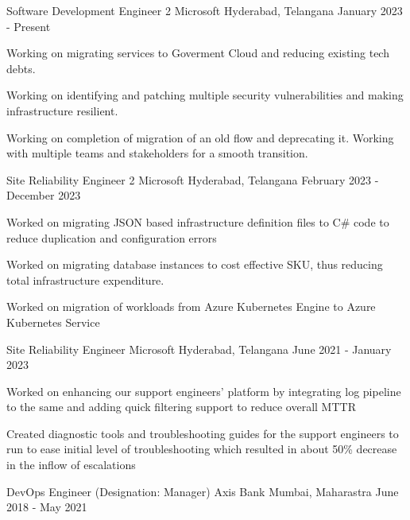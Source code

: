 
\begin{cventries}
  \cventry
  { Software Development Engineer 2}
  {Microsoft}
  {Hyderabad, Telangana}
  { January 2023 - Present}
  {
  \begin{cvitems}
      \item {Working on migrating services to Goverment Cloud and reducing existing tech debts.}
      \item {Working on identifying and patching multiple security vulnerabilities and making infrastructure resilient.}
      \item {Working on completion of migration of an old flow and deprecating it. Working with multiple teams and stakeholders for a smooth transition.}
  \end{cvitems}
  }
  \cventry
  {Site Reliability Engineer 2} %
  {Microsoft} %
  {Hyderabad, Telangana} %
  {February 2023 - December 2023} %
  {
  \begin{cvitems} %
  \item {Worked on migrating JSON based infrastructure definition files to C\# code to reduce duplication and configuration errors}
  \item {Worked on migrating database instances to cost effective SKU, thus reducing total infrastructure expenditure.}
  \item {Worked on migration of workloads from Azure Kubernetes Engine to Azure Kubernetes Service}
  \end{cvitems}
  }
  \cventry
  {Site Reliability Engineer} %
  {Microsoft} %
  {Hyderabad, Telangana} %
  {June 2021 - January 2023} %
  {
  \begin{cvitems} %
  \item {Worked on enhancing our support engineers' platform by integrating log pipeline to the same and adding quick filtering support to reduce overall MTTR}
  \item {Created diagnostic tools and troubleshooting guides for the support engineers to run to ease initial level of troubleshooting which resulted in about 50\% decrease in the inflow of escalations}
  \end{cvitems}
  }
  \cventry
    {DevOps Engineer (Designation: Manager)} %
    {Axis Bank} %
    {Mumbai, Maharastra} %
    {June 2018 - May 2021} %
    {
      \begin{cvitems} %

\end{cvitems}}
\end{cventries}
